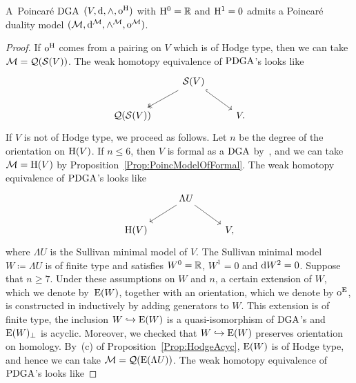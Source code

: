 \documentclass[\MainFolder/Text.tex]{subfiles}
\begin{document}
\begin{Proposition}[Existence of Poincar\'e duality model for $\H^1 = 0$]\label{Prop:ExOfLambrStan}
A~Poincar\'e $\mathrm{DGA}$ $(V,\mathrm{d},\wedge,\mathrm{o}^{\mathrm{H}})$ with $\mathrm{H}^0 = \mathbb{R}$ and $\H^1=0$ admits a Poincar\'e duality model $(\mathcal{M},\mathrm{d}^{\mathcal{M}},\wedge^{\mathcal{M}},\mathrm{o}^{\mathcal{M}})$.
\end{Proposition}
\begin{proof}
If $\mathrm{o}^{\mathrm{H}}$ comes from a pairing on $V$ which is of Hodge type, then we can take $\mathcal{M}=\mathcal{Q}(\mathcal{S}(V))$. The weak homotopy equivalence of $\mathrm{PDGA}$'s looks like
\begin{equation}\label{Eq:ModOne}
\begin{tikzcd}
 &  \VansSmall(V) \arrow[two heads]{dl}\arrow[hook]{dr} & \\
 \VansQuotient(\VansSmall(V)) & & V.
\end{tikzcd}
\end{equation}
If $V$ is not of Hodge type, we proceed as follows. Let $n$ be the degree of the orientation on $\mathrm{H}(V)$. If $n\le 6$, then $V$ is formal as a $\mathrm{DGA}$ by~\cite{Miller1979}, and we can take $\mathcal{M}=\mathrm{H}(V)$ by Proposition~\ref{Prop:PoincModelOfFormal}. The weak homotopy equivalence of $\mathrm{PDGA}$'s looks like
\begin{equation}\label{Eq:ModTwo}
\begin{tikzcd}
 & \Lambda U \arrow{dl}\arrow{dr} & \\
 \H(V) & & V,
\end{tikzcd}
\end{equation}
where $\Lambda U$ is the Sullivan minimal model of $V$. The Sullivan minimal model $W\coloneqq \Lambda U$ is of finite type and satisfies $W^0 = \mathbb{R}$, $W^1 = 0$ and $\mathrm{d} W^2 = 0$. Suppose that $n\ge 7$. Under these assumptions on $W$ and $n$, a certain extension of $W$, which we denote by~$\mathrm{E}(W)$, together with an orientation, which we denote by $\mathrm{o}^{\mathrm{E}}$, is constructed in \cite[Section~4]{Lambrechts2007} inductively by adding generators to $W$. This extension is of finite type, the inclusion $W\hookrightarrow\mathrm{E}(W)$ is a quasi-isomorphism of $\mathrm{DGA}$'s and $\mathrm{E}(W)_\perp$ is acyclic. Moreover, we checked that $W\hookrightarrow\mathrm{E}(W)$ preserves orientation on homology. By~(c) of Proposition~\ref{Prop:HodgeAcyc}, $\mathrm{E}(W)$ is of Hodge type, and hence we can take $\mathcal{M} = \mathcal{Q}(\mathrm{E}(\Lambda U))$. The weak homotopy equivalence of $\mathrm{PDGA}$'s looks like

\end{proof}
\end{document}
